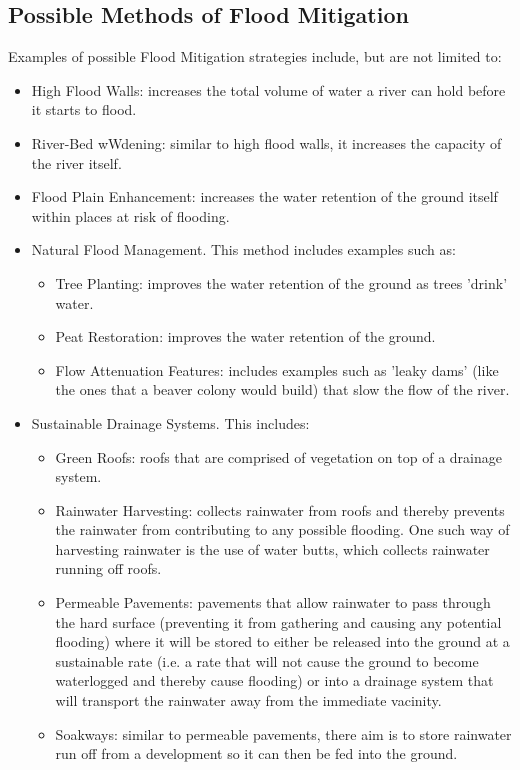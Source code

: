 \documentclass[11 pt, a4paper]{article}
\begin{document}
\subsection{Possible Methods of Flood Mitigation}
Examples of possible Flood Mitigation strategies include, but are not limited to:\\
\begin{itemize}
\item High Flood Walls: increases the total volume of water a river can hold before it starts to flood.
\item River-Bed wWdening: similar to high flood walls, it increases the capacity of the river itself.
\item Flood Plain Enhancement: increases the water retention of the ground itself within places at risk of flooding.
\item Natural Flood Management. This method includes examples such as:
\begin{itemize}
\item Tree Planting:  improves the water retention of the ground as trees 'drink' water.
\item Peat Restoration: improves the water retention of the ground.
\item Flow Attenuation Features: includes examples such as 'leaky dams' (like the ones that a beaver colony would build) that slow the flow of the river.
\end{itemize}
\item Sustainable Drainage Systems. This includes: \cite{4}
\begin{itemize}
\item Green Roofs: roofs that are comprised of vegetation on top of a drainage system.
\item Rainwater Harvesting: collects rainwater from roofs and thereby prevents the rainwater from contributing to any possible flooding. One such way of harvesting rainwater is the use of water butts, which collects rainwater running off roofs.
\item Permeable Pavements: pavements that allow rainwater to pass through the hard surface (preventing it from gathering and causing any potential flooding) where it will be stored to either be released into the ground at a sustainable rate (i.e. a rate that will not cause the ground to become waterlogged and thereby cause flooding) or into a drainage system that will transport the rainwater away from the immediate vacinity.
\item Soakways: similar to permeable pavements, there aim is to store rainwater run off from a development so it can then be fed into the ground.

\end{itemize}
\end{itemize}
\end{document}
